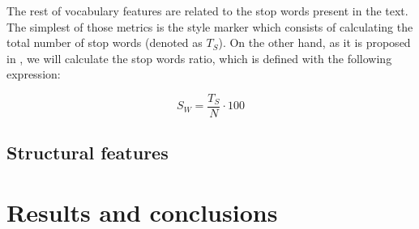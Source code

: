 The rest of vocabulary features are related to the stop words present in the text. The simplest of those metrics is the style marker which consists of calculating the total number of stop words (denoted as $T_S$). On the other hand, as it is proposed in \cite{ril2014determination},  we will calculate the stop words ratio, which is defined with the following expression:

$$
S_W = \frac{T_S}{N}\cdot 100
$$

\subsection{Structural features}\label{sssect:strucf}

\section{Results and conclusions} \label{ssection:resconc}
